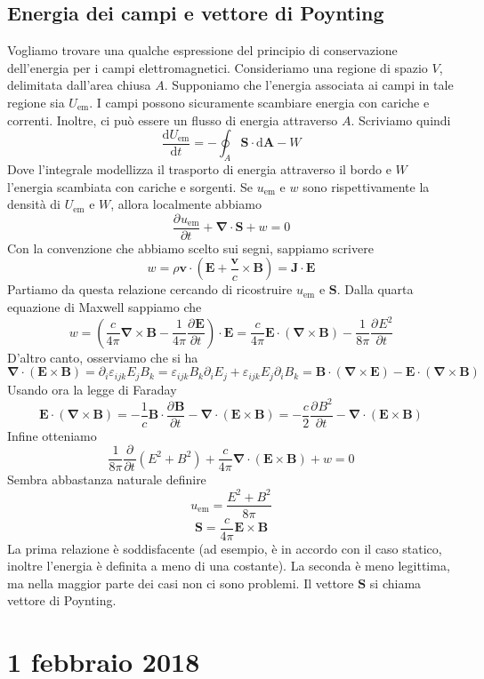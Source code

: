 \documentclass[a4paper,11pt]{book}
\newcommand{\dif}{\mathrm{d}}
\newcommand{\der}[3][]{\frac{\partial ^{#1}#2}{\partial {#3}^{#1}}}
\let\oldnabla\nabla
\renewcommand{\nabla}{\vec{\oldnabla}}
\renewcommand{\vec}[1]{\mathbf{#1}}
\theoremstyle{theorem}
\theoremstyle{definition}
\begin{document}
\subsection{Energia dei campi e vettore di Poynting}
Vogliamo trovare una qualche espressione del principio di conservazione dell'energia per i campi elettromagnetici. Consideriamo una regione di spazio $V$, delimitata dall'area chiusa $A$. Supponiamo che l'energia associata ai campi in tale regione sia $U_{\mathrm{em}}$. I campi possono sicuramente scambiare energia con cariche e correnti. Inoltre, ci può essere un flusso di energia attraverso $A$. Scriviamo quindi
\[\frac{\mathrm{d}U_{\mathrm{em}}}{\mathrm{d}t}=-\oint_{A}\vec{S}\cdot\dif\vec{A}-W\]
Dove l'integrale modellizza il trasporto di energia attraverso il bordo e $W$ l'energia scambiata con cariche e sorgenti. Se $u_{\mathrm{em}}$ e $w$ sono rispettivamente la densità di $U_{\mathrm{em}}$ e $W$, allora localmente abbiamo
\[\der{u_{\mathrm{em}}}{t}+\nabla\cdot\vec{S}+w=0\]
Con la convenzione che abbiamo scelto sui segni, sappiamo scrivere
\[w=\rho\vec{v}\cdot\left(\vec{E}+\frac{\vec{v}}{c}\times\vec{B}\right)=\vec{J}\cdot\vec{E}\]
Partiamo da questa relazione cercando di ricostruire $u_{\mathrm{em}}$ e $\vec{S}$.
Dalla quarta equazione di Maxwell sappiamo che
\[w=\left(\frac{c}{4\pi}\nabla\times\vec{B}-\frac{1}{4\pi}\der{\vec{E}}{t}\right)\cdot\vec{E}=\frac{c}{4\pi}\vec{E}\cdot(\nabla\times\vec{B})-\frac{1}{8\pi}\der{E^2}{t}\]
D'altro canto, osserviamo che si ha
\[\nabla\cdot(\vec{E}\times\vec{B})=\partial_i\varepsilon_{ijk}E_jB_k=\varepsilon_{ijk}B_k\partial_iE_j+\varepsilon_{ijk}E_j\partial_iB_k=\vec{B}\cdot(\nabla\times\vec{E})-\vec{E}\cdot(\nabla\times\vec{B})\]
Usando ora la legge di Faraday
\[\vec{E}\cdot(\nabla\times\vec{B})=-\frac{1}{c}\vec{B}\cdot\der{\vec{B}}{t}-\nabla\cdot(\vec{E}\times\vec{B})=-\frac{c}{2}\der{B^2}{t}-\nabla\cdot(\vec{E}\times\vec{B})\]
Infine otteniamo
\[\frac{1}{8\pi}\der{}{t}\left(E^2+B^2\right)+\frac{c}{4\pi}\nabla\cdot(\vec{E}\times\vec{B})+w=0\]
Sembra abbastanza naturale definire
\[u_{\mathrm{em}}=\frac{E^2+B^2}{8\pi}\]
\[\vec{S}=\frac{c}{4\pi}\vec{E}\times\vec{B}\]
La prima relazione è soddisfacente (ad esempio, è in accordo con il caso statico, inoltre l'energia è definita a meno di una costante). La seconda è meno legittima, ma nella maggior parte dei casi non ci sono problemi. Il vettore $\vec{S}$ si chiama vettore di Poynting.
\newpage
\section{1 febbraio 2018}
\end{document}
